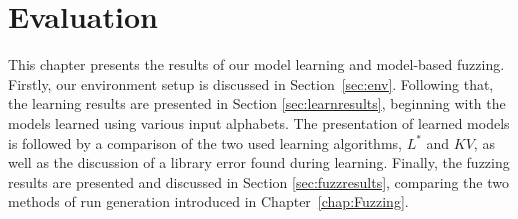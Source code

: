 %
%
% 
% 
% 

\chapter{Evaluation} \label{chap:Evaluation}

This chapter presents the results of our model learning and model-based fuzzing. Firstly, our environment setup is discussed in Section~\ref{sec:env}. Following that, the learning results are presented in Section \ref{sec:learnresults}, beginning with the models learned using various input alphabets. The presentation of learned models is followed by a comparison of the two used learning algorithms, $L^*$ and $KV$, as well as the discussion of a library error found during learning. Finally, the fuzzing results are presented and discussed in Section \ref{sec:fuzzresults}, comparing the two methods of run generation introduced in Chapter~\ref{chap:Fuzzing}.

